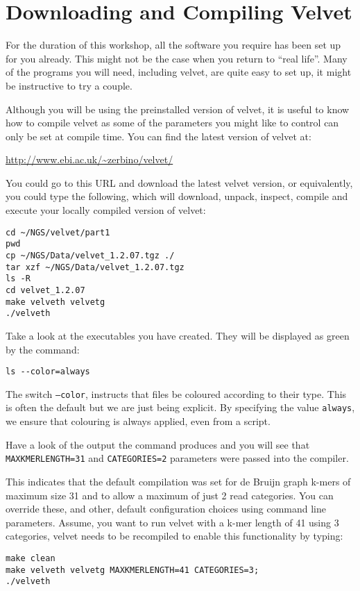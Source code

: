 \section{Downloading and Compiling Velvet}
\begin{note}
For the duration of this workshop, all the software you require has been set up
for you already. This might not be the case when you return to ``real life''. Many
of the programs you will need, including velvet, are quite easy to set up, it
might be instructive to try a couple.
\end{note}

\begin{information}
Although you will be using the preinstalled version of velvet, it is useful to
know how to compile velvet as some of the parameters you might like to control
can only be set at compile time. You can find the latest version of velvet at:

{\centering
\url{http://www.ebi.ac.uk/~zerbino/velvet/}
 
}

You could go to this URL and download the latest velvet version, or
equivalently, you could type the following, which will download, unpack,
inspect, compile and execute your locally compiled version of velvet:
\begin{lstlisting}
cd ~/NGS/velvet/part1
pwd
cp ~/NGS/Data/velvet_1.2.07.tgz ./
tar xzf ~/NGS/Data/velvet_1.2.07.tgz
ls -R
cd velvet_1.2.07
make velveth velvetg
./velveth
\end{lstlisting}
\end{information}

\begin{steps}
Take a look at the executables you have created. They will be displayed as green
by the command:
\begin{lstlisting}
ls --color=always
\end{lstlisting}
\end{steps}

\begin{note}
The switch \texttt{--color}, instructs that files be coloured according to their
type. This is often the default but we are just being explicit. By specifying
the value \texttt{always}, we ensure that colouring is always applied, even from
a script.
\end{note}

\begin{steps}
Have a look of the output the command produces and you will see that
\texttt{MAXKMERLENGTH=31} and \texttt{CATEGORIES=2} parameters were passed into
the compiler.

This indicates that the default compilation was set for de Bruijn graph k-mers of
maximum size 31 and to allow a maximum of just 2 read categories. You can
override these, and other, default configuration choices using command line
parameters. Assume, you want to run velvet with a k-mer length of 41 using 3
categories, velvet needs to be recompiled to enable this functionality by
typing:
\begin{lstlisting}
make clean
make velveth velvetg MAXKMERLENGTH=41 CATEGORIES=3;
./velveth
\end{lstlisting}
\end{steps}

